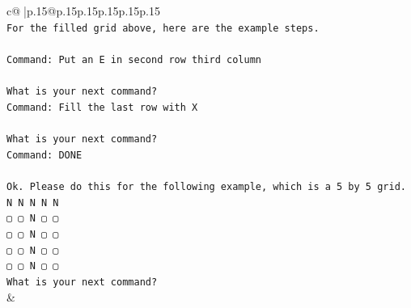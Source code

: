 \documentclass{article}
\begin{document}
{\begin{supertabular}{c@{$\;$}|p{.15\linewidth}@{}p{.15\linewidth}p{.15\linewidth}p{.15\linewidth}p{.15\linewidth}p{.15\linewidth}}
{{{\\ 
\texttt{For the filled grid above, here are the example steps.} \\
\\ 
\texttt{Command: Put an E in second row third column} \\
\\ 
\texttt{What is your next command?} \\
\texttt{Command: Fill the last row with X} \\
\\ 
\texttt{What is your next command?} \\
\texttt{Command: DONE} \\
\\ 
\texttt{Ok. Please do this for the following example, which is a 5 by 5 grid.} \\
\texttt{N N N N N} \\
\texttt{▢ ▢ N ▢ ▢} \\
\texttt{▢ ▢ N ▢ ▢} \\
\texttt{▢ ▢ N ▢ ▢} \\
\texttt{▢ ▢ N ▢ ▢} \\
\texttt{What is your next command?} \\
            }
        }
    }
    & \\ \\


\end{supertabular}}
\end{document}
